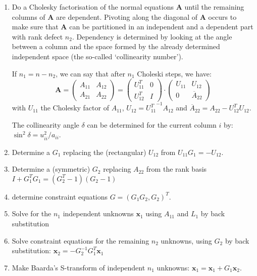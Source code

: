 \begin{enumerate}
	\item Do a Cholesky factorisation of the normal
equations $\mathbf{A}$ until the remaining columns of $\mathbf{A}$ are
dependent. Pivoting along the diagonal of $\mathbf{A}$ occurs to make sure
that $\mathbf{A}$ can be partitioned in an independent and a dependent part
with rank
defect $n_{2}$. Dependency is determined by looking at the angle between a
column and the space formed by the already determined independent space (the
so-called `collinearity number').

If $n_{1}=n-n_{2}$, we can say that after $n_{1}$ Choleski steps, we have:
\begin{equation}
	\mathbf{A} = \left( \begin{array} {cc}
			    A_{11} & A_{12} \\
				A_{21} & A_{22}
			    \end{array} \right) =
	\left( \begin{array} {cc}
		U_{11}^{T} & 0 \\
		U_{12}^{T} & I
	\end{array} \right) \cdot
	\left( \begin{array} {cc}
		U_{11} & U_{12} \\
		0 & \overline{A}_{22}
	\end{array} \right)
\end{equation}
with $U_{11}$ the Cholesky factor of $A_{11}$, $U_{12}={U_{11}^{T}}^{-1}
A_{12}$ and $\overline{A}_{22}=A_{22}-U_{12}^{T}U_{12}$.

The collinearity angle $\delta$ can be determined for the current column $i$
by: $\sin^{2}\delta = u_{ii}^{2}/a_{ii}$. \Mn
	\item Determine a $G_{1}$ replacing the (rectangular) $U_{12}$ from
$U_{11} G_{1} = -U_{12}$. \Mn
	\item Determine a (symmetric) $G_{2}$ replacing $A_{22}$ from the
rank basis $I+G_{1}^{T}G_{1} = (G_{2}^{T}-1)(G_{2}-1)$ \Mn
	\item determine constraint equations
$G={\left( G_{1}G_{2},G_{2}\right)}^{T}$. \Mn
	\item Solve for the $n_{1}$ independent unknowns $\mathbf{x}_{1}$
using $A_{11}$ and $L_{1}$ by back substitution \Mn
	\item Solve constraint equations for the remaining $n_{2}$ unknowns,
using $G_{2}$ by back substitution:
$\mathbf{x}_{2}=-G_{2}^{-1}G_{1}^{T}\mathbf{x}_{1}$ \Mn
	\item Make Baarda's S-transform of independent $n_{1}$ unknowns:
$\mathbf{x}_{1}=\mathbf{x}_{1}+G_{1}\mathbf{x}_{2}$. \Mn
\end{enumerate}
